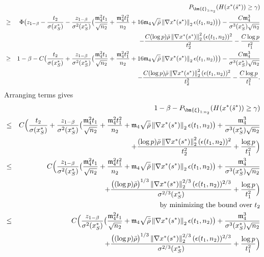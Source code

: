 \documentclass[mnsc,blindrev]{informs4} %
\newcommand{\norm}[1]{\left \Vert #1 \right\Vert}
\begin{document}
\begin{eqnarray*}
&&P_{\bm{\xi}_{1:n_2}}(H(x^*(\hat s^*))\geq \gamma)\\
&\geq&\Phi\big( z_{1-\beta}-\frac{t_2}{\sigma(x^*_S)}-\frac{z_{1-\beta}}{\sigma^2(x^*_S)}\big(\frac{\mathfrak{m}_4^2t_1}{\sqrt{n_2}}+\frac{\mathfrak{m}_4^2t_1^2}{n_2}+16\mathfrak{m}_4 \sqrt{\bar{\rho}}\norm{\nabla x^*(s^*)}_2\epsilon(t_1,n_2)\big)\big)-\frac{C\mathfrak{m}_4^3}{\sigma^3(x^*_S)\sqrt{n_2}}\\
&&\hspace{5ex}-\frac{C(\log p) \bar{\rho}\norm{\nabla x^*(s^*)}_2^2(\epsilon(t_1,n_2))^2}{t_2^2}-\frac{C\log p}{t_1^2}\\
&\geq& 1-\beta-C\big(\frac{t_2}{\sigma(x^*_S)}+\frac{z_{1-\beta}}{\sigma^2(x^*_S)}\big(\frac{\mathfrak{m}_4^2t_1}{\sqrt{n_2}}+\frac{\mathfrak{m}_4^2t_1^2}{n_2}+16\mathfrak{m}_4 \sqrt{\bar{\rho}}\norm{\nabla x^*(s^*)}_2\epsilon(t_1,n_2)\big)\big)-\frac{C\mathfrak{m}_4^3}{\sigma^3(x^*_S)\sqrt{n_2}}\\
&&\hspace{5ex}-\frac{C(\log p) \bar{\rho}\norm{\nabla x^*(s^*)}_2^2(\epsilon(t_1,n_2))^2}{t_2^2}-\frac{C\log p}{t_1^2}.
\end{eqnarray*}
Arranging terms gives
\begin{eqnarray}
\notag&&1-\beta-P_{\bm{\xi}_{1:n_2}}(H(x^*(\hat s^*))\geq \gamma)\\
\notag&\leq &C\Big(\frac{t_2}{\sigma(x^*_S)}+\frac{z_{1-\beta}}{\sigma^2(x^*_S)}\big(\frac{\mathfrak{m}_4^2t_1}{\sqrt{n_2}}+\frac{\mathfrak{m}_4^2t_1^2}{n_2}+\mathfrak{m}_4 \sqrt{\bar{\rho}}\norm{\nabla x^*(s^*)}_2\epsilon(t_1,n_2)\big)+\frac{\mathfrak{m}_4^3}{\sigma^3(x^*_S)\sqrt{n_2}}\\
\notag&&\hspace{5ex}+\frac{(\log p) \bar{\rho}\norm{\nabla x^*(s^*)}_2^2(\epsilon(t_1,n_2))^2}{t_2^2}+\frac{\log p}{t_1^2}\Big)\\
&\leq &C\Big(\frac{z_{1-\beta}}{\sigma^2(x^*_S)}\big(\frac{\mathfrak{m}_4^2t_1}{\sqrt{n_2}}+\frac{\mathfrak{m}_4^2t_1^2}{n_2}+\mathfrak{m}_4 \sqrt{\bar{\rho}}\norm{\nabla x^*(s^*)}_2\epsilon(t_1,n_2)\big)+\frac{\mathfrak{m}_4^3}{\sigma^3(x^*_S)\sqrt{n_2}}\label{finite sample error:gsc1}\\
\notag&&\hspace{5ex}+\frac{\big((\log p) \bar{\rho}\big)^{1/3}\norm{\nabla x^*(s^*)}_2^{2/3}(\epsilon(t_1,n_2))^{2/3}}{\sigma^{2/3}(x^*_S)}+\frac{\log p}{t_1^2}\Big)\\
\notag&&\text{\ \ by minimizing the bound over $t_2$}\\
\notag&\leq &C\Big(\frac{z_{1-\beta}}{\sigma^2(x^*_S)}\big(\frac{\mathfrak{m}_4^2t_1}{\sqrt{n_2}}+\mathfrak{m}_4 \sqrt{\bar{\rho}}\norm{\nabla x^*(s^*)}_2\epsilon(t_1,n_2)\big)+\frac{\mathfrak{m}_4^3}{\sigma^3(x^*_S)\sqrt{n_2}}\\
\notag&&\hspace{5ex}+\frac{\big((\log p) \bar{\rho}\big)^{1/3}\norm{\nabla x^*(s^*)}_2^{2/3}(\epsilon(t_1,n_2))^{2/3}}{\sigma^{2/3}(x^*_S)}+\frac{\log p}{t_1^2}\Big)
\end{eqnarray}
\end{document}
